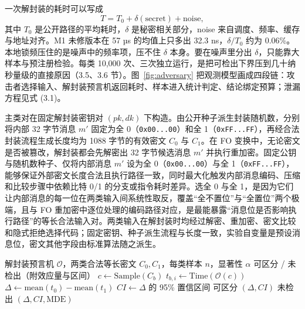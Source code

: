 一次解封装的耗时可以写成
\begin{equation}\tag{3.1}
T = T_0 + \delta(\text{secret}) + \text{noise},
\end{equation}
其中 $T_0$ 是公开路径的平均耗时，$\delta$ 是秘密相关部分，noise 来自调度、频率、缓存与地址对齐。M1 未修版本在 57 µs 的均值上只多出 32.3 ns，$\delta/T_0$ 约为 0.06\%。本地锁频压住的是噪声中的频率项，压不住 $\delta$ 本身。要在噪声里分出 $\delta$，只能靠大样本与预注册检验。每类 10,000 次、三次独立运行，是把可检出下界压到几十纳秒量级的直接原因（3.5、3.6 节）。图~\ref{fig:adversary} 把观测模型画成四段链：攻击者选择输入、解封装预言机返回耗时、样本进入统计判定、结论绑定预算；泄漏方程见式 (3.1)。 %

主类对在固定解封装密钥对 $(pk,dk)$ 下构造。由公开种子派生封装随机数，分别将内部 32 字节消息 $m'$ 固定为全 0（\texttt{0x00...00}）和全 1（\texttt{0xFF...FF}），再经合法封装流程生成长度均为 1088 字节的有效密文 $C_0$ 与 $C_1$。在 FO 变换中，无论密文是否被篡改，解封装都会先解密出 32 字节候选消息 $m'$ 并执行重加密。固定公钥与随机数种子、仅将内部消息 $m'$ 设为全 0（\texttt{0x00...00}）与全 1（\texttt{0xFF...FF}），能够保证外部密文长度合法且执行路径一致，同时最大化触发内部消息编码、压缩和比较步骤中依赖比特 0/1 的分支或指令耗时差异。选全 0 与全 1，是因为它们让内部消息的每一位在两类输入间系统性取反，覆盖“全不置位”与“全置位”两个极端，且与 FO 重加密中逐位处理的编码路径对应，是最能暴露“消息位是否影响执行路径”的等长合法输入对。两类输入在解封装时均经过解密、重加密、密文比较和隐式拒绝选择代码；固定密钥、种子派生流程与长度一致，实验自变量是预设消息位，密文其他字段由标准算法随之派生。

\begin{algorithm}[H]
\caption{攻击者的计时观测与可区分性实验}
\label{alg:distinguish}
\begin{algorithmic}[1]
\Require 解封装预言机 $\mathcal{O}$，两类合法等长密文 $C_0,C_1$，每类样本 $n$，显著性 $\alpha$
\Ensure 可区分 / 未检出（附效应量与区间）
    \State $c \gets \mathrm{Sample}(C_b)$ 
    \State $t_{b,i} \gets \mathrm{Time}(\mathcal{O}(c))$ 
  \EndFor
\EndFor
\State $\Delta \gets \mathrm{mean}(t_0) - \mathrm{mean}(t_1)$
\State $CI \gets \Delta$ 的 95\% 置信区间
  \State \Return 可区分 $(\Delta, CI)$
\Else
  \State \Return 未检出 $(\Delta, CI, \mathrm{MDE})$
\EndIf
\end{algorithmic}
\end{algorithm}

